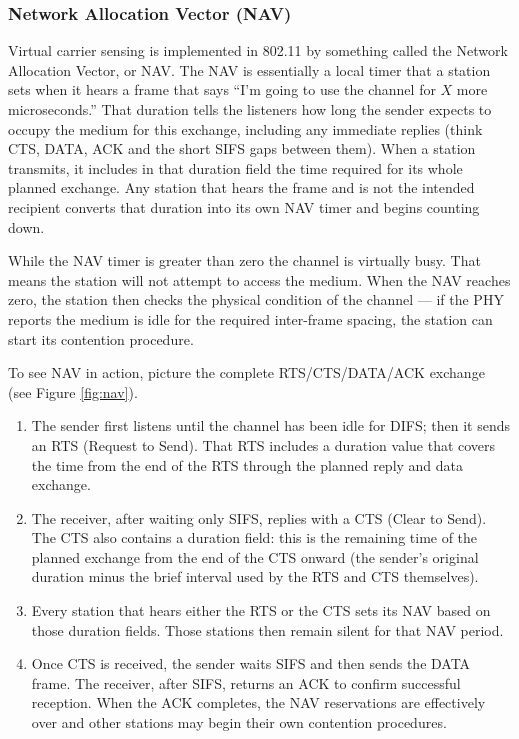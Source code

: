 \subsubsection{Network Allocation Vector (NAV)}
Virtual carrier sensing is implemented in 802.11 by something called the Network Allocation Vector, or NAV. The NAV is essentially a local timer that a station sets when it hears a frame that says “I’m going to use the channel for $X$ more microseconds.” That duration tells the listeners how long the sender expects to occupy the medium for this exchange, including any immediate replies (think CTS, DATA, ACK and the short SIFS gaps between them). When a station transmits, it includes in that duration field the time required for its whole planned exchange. Any station that hears the frame and is not the intended recipient converts that duration into its own NAV timer and begins counting down.

While the NAV timer is greater than zero the channel is virtually busy. That means the station will not attempt to access the medium. When the NAV reaches zero, the station then checks the physical condition of the channel — if the PHY reports the medium is idle for the required inter-frame spacing, the station can start its contention procedure.

To see NAV in action, picture the complete RTS/CTS/DATA/ACK exchange (see Figure \ref{fig:nav}). 
\begin{enumerate}
    \item The sender first listens until the channel has been idle for DIFS; then it sends an RTS (Request to Send). That RTS includes a duration value that covers the time from the end of the RTS through the planned reply and data exchange.
    \item The receiver, after waiting only SIFS, replies with a CTS (Clear to Send). The CTS also contains a duration field: this is the remaining time of the planned exchange from the end of the CTS onward (the sender’s original duration minus the brief interval used by the RTS and CTS themselves). 
    \item Every station that hears either the RTS or the CTS sets its NAV based on those duration fields. Those stations then remain silent for that NAV period.
    \item Once CTS is received, the sender waits SIFS and then sends the DATA frame. The receiver, after SIFS, returns an ACK to confirm successful reception. When the ACK completes, the NAV reservations are effectively over and other stations may begin their own contention procedures.
\end{enumerate}

